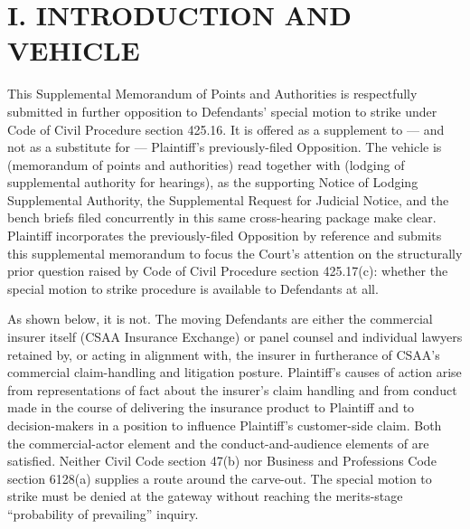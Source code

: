 \newcommand{\docshorttitle}{SUPPL.\ MEMO P\&A --- \S 425.17(c) COMMERCIAL CARVE-OUT (CGC-25-631801)}
\newcommand{\doctitleblock}{PLAINTIFF'S SUPPLEMENTAL MEMORANDUM OF POINTS AND AUTHORITIES IN FURTHER OPPOSITION TO DEFENDANTS' SPECIAL MOTION TO STRIKE (CODE CIV.\ PROC., \S\S~425.16, 425.17(c))}
\newcommand{\docsubblock}{(Cal.\ Rules of Court, rules 3.1113, 3.1306(c); supplemental to Plaintiff's previously-filed Opposition; cross-noticed for hearings of May 12, 2026 and May 22, 2026, Dept.\ 301)}




\section*{I. INTRODUCTION AND VEHICLE}

This Supplemental Memorandum of Points and Authorities is respectfully submitted in further opposition to Defendants' special motion to strike under Code of Civil Procedure section 425.16. It is offered as a supplement to --- and not as a substitute for --- Plaintiff's previously-filed Opposition. The vehicle is  (memorandum of points and authorities) read together with  (lodging of supplemental authority for hearings), as the supporting Notice of Lodging Supplemental Authority, the Supplemental Request for Judicial Notice, and the bench briefs filed concurrently in this same cross-hearing package make clear. Plaintiff incorporates the previously-filed Opposition by reference and submits this supplemental memorandum to focus the Court's attention on the structurally prior question raised by Code of Civil Procedure section 425.17(c): whether the special motion to strike procedure is available to Defendants at all.

As shown below, it is not. The moving Defendants are either the commercial insurer itself (CSAA Insurance Exchange) or panel counsel and individual lawyers retained by, or acting in alignment with, the insurer in furtherance of CSAA's commercial claim-handling and litigation posture. Plaintiff's causes of action arise from representations of fact about the insurer's claim handling and from conduct made in the course of delivering the insurance product to Plaintiff and to decision-makers in a position to influence Plaintiff's customer-side claim. Both the commercial-actor element and the conduct-and-audience elements of  are satisfied. Neither Civil Code section 47(b) nor Business and Professions Code section 6128(a) supplies a route around the carve-out. The special motion to strike must be denied at the gateway without reaching the merits-stage  ``probability of prevailing'' inquiry.

